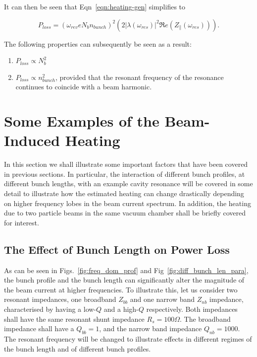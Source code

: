 \documentclass{cernrep}
\begin{document}
It can then be seen that Eqn~\ref{eqn:heating-gen} simplifies to

\begin{equation}
P_{loss} = \left( \omega_{rev}eN_{b}n_{bunch}  \right)^{2}  \left( 2 \left| \lambda \left( \omega_{res} \right)  \right|^{2}  \Re{}e \left( Z_{\parallel} \left(\omega_{res} \right) \right) \right). 
\label{eqn:heating-high-q}
\end{equation}

The following properties can subsequently be seen as a result:

\begin{enumerate}
\item{$P_{loss} \propto N_{b}^{2}$}
\item{$P_{loss} \propto n_{bunch}^{2}$, provided that the resonant frequency of the resonance continues to coincide with a beam harmonic.}
\end{enumerate}

\section{Some Examples of the Beam-Induced Heating}

In this section we shall illustrate some important factors that have been covered in previous sections. In particular, the interaction of different bunch profiles, at different bunch lengths, with an example cavity resonance will be covered in some detail to illustrate how the estimated heating can change drastically depending on higher frequency lobes in the beam current spectrum. In addition, the heating due to two particle beams in the same vacuum chamber shall be briefly covered for interest.

\subsection{The Effect of Bunch Length on Power Loss}

As can be seen in Figs.~\ref{fig:freq_dom_prof} and Fig~\ref{fig:diff_bunch_len_para}, the bunch profile and the bunch length can significantly alter the magnitude of the beam current at higher frequencies. To illustrate this, let us consider two resonant impedances, one broadband $Z_{bb}$ and one narrow band $Z_{nb}$ impedance, characterised by having a low-$Q$ and a high-$Q$ respectively. Both impedances shall have the same resonant shunt impedance $R_{s} = 100\Omega$. The broadband impedance shall have a $Q_{bb}=1$, and the narrow band impedance $Q_{nb}=1000$. The resonant frequency will be changed to illustrate effects in different regimes of the bunch length and of different bunch profiles.
\end{document}
